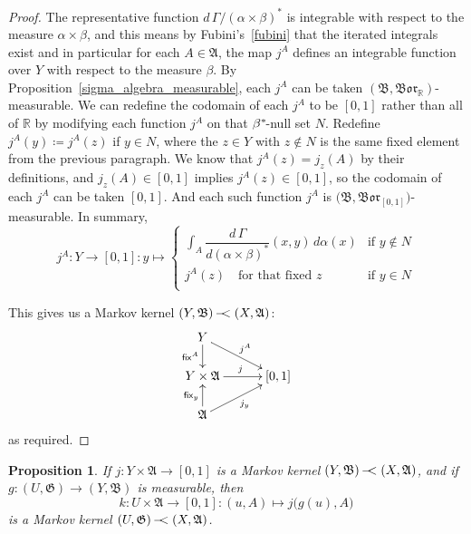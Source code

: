 \documentclass[
twoside=true,
paper=letter,
fontsize=9pt,
pagesize=auto,
leqno,
openany,
headsepline,
overfullrule,
]{scrbook}
\theoremstyle{plain}
\theoremstyle{plain}
\newtheorem{prop}[thm]{Proposition}
\theoremstyle{definition}
\theoremstyle{bfnoteitalic}
\theoremstyle{bfnoteroman}
\newcommand{\sigalg}[1]{\mathfrak{#1}}
\newcommand{\definedby}{\coloneqq}
\newcommand{\sfop}[1]{\mathsf{#1}}
\newcommand{\borel}{\mathfrak{Bor}}
\newcommand{\R}{\mathbb{R}}
\newcommand{\sigmaalgebra}{\sigalg{A}}
\newcommand{\sigmaalgebraii}{\sigalg{B}}
\newcommand{\kernast}{\ast\kern-1pt}
\newcommand{\funcg}{g}
\newcommand{\funcj}{j}
\newcommand{\funck}{k}
\newcommand{\measurespace}{X}
\newcommand{\measurespaceii}{Y}
\newcommand{\mspaceelt}{x}
\newcommand{\mspaceeltii}{y}
\newcommand{\mspaceeltiii}{z}
\newcommand{\seti}{A}
\newcommand{\fixinthefirst}[1]{\sfop{fix}_{#1}}
\newcommand{\fixinthesecond}[1]{\sfop{fix}^{#1}}
\newcommand{\uspace}{U}%
\newcommand{\uspaceelt}{u}
\newcommand{\transition}{\,-\kern-6pt <}
\newcommand{\measonprod}{\Gamma}%
\newcommand{\marginalone}{\alpha}%
\newcommand{\marginaltwo}{\beta}%
\begin{document}
\begin{proof}
The representative function
$d\,\measonprod/(\marginalone\times\marginaltwo)^*$
is integrable with respect to the measure
$\marginalone\times\marginaltwo$, and this means  by Fubini's~\ref{fubini} that the iterated integrals exist and in particular for each
$\seti\in\sigmaalgebra$,
the map $\funcj^\seti$ defines an integrable function over
$\measurespaceii$ with respect to the measure $\marginaltwo$.
By Proposition~\ref{sigma_algebra_measurable}, each $\funcj^\seti$ can be taken
$(\sigmaalgebraii,\borel_\R)$\hyp{}measurable.
We can redefine the codomain of each
$\funcj^\seti$ to be $[0,1]$ rather than all of $\R$
by modifying each function $\funcj^\seti$ on that $\marginaltwo^\kernast$\hyp{}null set $N$.
Redefine
$\funcj^\seti(\mspaceeltii)
\definedby
\funcj^\seti(\mspaceeltiii)$ if $\mspaceeltii \in N$,
where the
$\mspaceeltiii\in\measurespaceii$ with $\mspaceeltiii\notin N$
is the same fixed element from the previous paragraph.
We know that
$\funcj^\seti(\mspaceeltiii)= \funcj_\mspaceeltiii(\seti)$ by their definitions,
and
$\funcj_\mspaceeltiii(\seti) \in [0,1]$
implies
$\funcj^\seti(\mspaceeltiii) \in [0,1]$,
so the codomain of each $j^\seti$ can be taken $[0,1]$. And each such function $\funcj^\seti$ is
$\bigl( \sigmaalgebraii, \borel_{[0,1]} \bigr)$\hyp{}measurable.
In summary,
\[
\funcj^\seti
:\measurespaceii \to [0,1]
:\mspaceeltii \mapsto
\begin{cases}
\displaystyle \int_\seti
\dfrac{d\,\measonprod}{d(\marginalone\times\marginaltwo)^*}
(\mspaceelt,\mspaceeltii)\, d\marginalone(\mspaceelt)
& \text{if $\mspaceeltii\notin N$}
\\
\funcj^\seti(\mspaceeltiii)  \quad\text{for that fixed $\mspaceeltiii$}
& \text{if $\mspaceeltii \in N$}
\\
\end{cases}
\]

This gives us a Markov kernel
$(\measurespaceii,\sigmaalgebraii)\transition (\measurespace,\sigmaalgebra)$:
\[
\xymatrix@R=16pt@C=30pt{
\measurespaceii
\ar[d]_-{\fixinthesecond{\seti}}
\ar[dr]^{\funcj^\seti} &
\\
\measurespaceii\times\sigmaalgebra \ar[r]^{\funcj} & [0,1]
\\
\sigmaalgebra
\ar[ur]_{\funcj_\mspaceeltii}
\ar[u]^{\fixinthefirst{\mspaceeltii}} &
\\
}
\]
as required.
\end{proof}


\begin{prop}\label{markov_composition_measurable}
If
$\funcj: \measurespaceii \times \sigmaalgebra \to [0,1]$
is a Markov kernel
$(\measurespaceii,\sigmaalgebraii) \transition (\measurespace, \sigmaalgebra)$,
and if $\funcg : (\uspace, \sigalg{G}) \to (\measurespaceii, \sigmaalgebraii)$ is measurable, then
\[
\funck:\uspace\times\sigmaalgebra \to [0,1]
:(\uspaceelt,\seti) \mapsto \funcj \bigl( \funcg(\uspaceelt), \seti \bigr)
\]
is a Markov kernel
$(\uspace,\sigalg{G}) \transition (\measurespace, \sigmaalgebra)$.
\end{prop}
\end{document}

